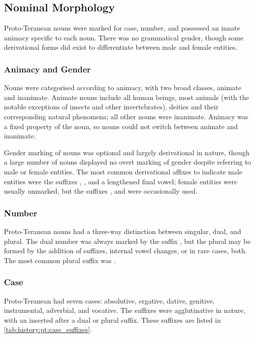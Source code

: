\documentclass[grammar]{subfiles}
\begin{document}
\subsection{Nominal Morphology}
\label{ssec:history:pt:nominal_morphology}

Proto-Teranean nouns were marked for case, number, and possessed an innate
animacy specific to each noun.  There was no grammatical gender, though some
derivational forms did exist to differentiate between male and female entities.

\subsubsection{Animacy and Gender}
\label{sssec:history:pt:nm:animacy}

Nouns were categorised according to animacy, with two broad classes, animate
and inanimate.  Animate nouns include all human beings, most animals (with the
notable exceptions of insects and other invertebrates), deities and their
corresponding natural phenomena; all other nouns were inanimate.  Animacy was a
fixed property of the noun, so nouns could not switch between animate and
inanimate.

Gender marking of nouns was optional and largely derivational in nature, though
a large number of nouns displayed no overt marking of gender despite referring
to male or female entities.  The most common derivational affixes to indicate
male entities were the suffixes , , and a lengthened final vowel;
female entities were usually unmarked, but the suffixes ,  and
 were occasionally used.

\subsubsection{Number}
\label{sssec:history:pt:nm:number}

Proto-Teranean nouns had a three-way distinction between singular, dual, and
plural.  The dual number was always marked by the suffix , but the
plural may be formed by the addition of suffixes, internal vowel changes, or in
rare cases, both.  The most common plural suffix was .

\subsubsection{Case}
\label{sssec:history:pt:nm:case}

Proto-Teranean had seven cases: absolutive, ergative, dative, genitive,
instrumental, adverbial, and vocative.  The suffixes were agglutinative in
nature, with an  inserted after a dual or plural suffix.  These suffixes
are listed in \cref{tab:history:pt:case_suffixes}.
\end{document}
